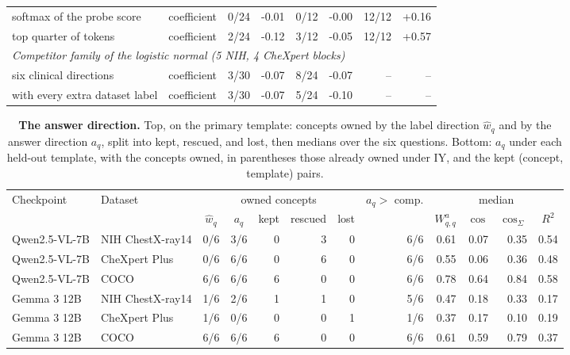 \documentclass{article}
\begin{document}
\begin{table}[h]
\begin{tabular}{llrrrrrr}
\quad softmax of the probe score & coefficient & 0/24 & -0.01 & 0/12 & -0.00 & 12/12 & +0.16 \\
\quad top quarter of tokens & coefficient & 2/24 & -0.12 & 3/12 & -0.05 & 12/12 & +0.57 \\
\midrule
\multicolumn{8}{l}{\textit{Competitor family of the logistic normal (5 NIH, 4 CheXpert blocks)}} \\
\quad six clinical directions & coefficient & 3/30 & -0.07 & 8/24 & -0.07 & -- & -- \\
\quad with every extra dataset label & coefficient & 3/30 & -0.07 & 5/24 & -0.10 & -- & -- \\
\bottomrule
\end{tabular}
\end{table}
\begin{table}[h]
\centering
\scriptsize
\setlength{\tabcolsep}{3.5pt}
\caption{\textbf{The answer direction.} Top, on the primary template: concepts owned by the label direction $\hat w_q$ and by the answer direction $a_q$, split into kept, rescued, and lost, then medians over the six questions. Bottom: $a_q$ under each held-out template, with the concepts owned, in parentheses those already owned under IY, and the kept (concept, template) pairs.}
\label{tab:cf-ansdir}
\begin{tabular}{llrrrrrrrrrr}
\toprule
\multirow{2}{*}{Checkpoint} & \multirow{2}{*}{Dataset} & \multicolumn{5}{c}{owned concepts} & \multirow{2}{*}{$a_q>$ comp.} & \multicolumn{4}{c}{median}\\
\cmidrule(lr){3-7}\cmidrule(lr){9-12}
&  & \multicolumn{1}{c}{$\hat w_q$} & \multicolumn{1}{c}{$a_q$} & \multicolumn{1}{c}{kept} & \multicolumn{1}{c}{rescued} & \multicolumn{1}{c}{lost} &  & \multicolumn{1}{c}{$W^a_{q,q}$} & \multicolumn{1}{c}{$\cos$} & \multicolumn{1}{c}{$\cos_\Sigma$} & \multicolumn{1}{c}{$R^2$}\\
\midrule
Qwen2.5-VL-7B & NIH ChestX-ray14 & 0/6 & 3/6 & 0 & 3 & 0 & 6/6 & 0.61 & 0.07 & 0.35 & 0.54 \\
Qwen2.5-VL-7B & CheXpert Plus & 0/6 & 6/6 & 0 & 6 & 0 & 6/6 & 0.55 & 0.06 & 0.36 & 0.48 \\
Qwen2.5-VL-7B & COCO & 6/6 & 6/6 & 6 & 0 & 0 & 6/6 & 0.78 & 0.64 & 0.84 & 0.58 \\
Gemma 3 12B & NIH ChestX-ray14 & 1/6 & 2/6 & 1 & 1 & 0 & 5/6 & 0.47 & 0.18 & 0.33 & 0.17 \\
Gemma 3 12B & CheXpert Plus & 1/6 & 0/6 & 0 & 0 & 1 & 1/6 & 0.37 & 0.17 & 0.10 & 0.19 \\
Gemma 3 12B & COCO & 6/6 & 6/6 & 6 & 0 & 0 & 6/6 & 0.61 & 0.59 & 0.79 & 0.37 \\

\end{tabular}
\end{table}
\end{document}
